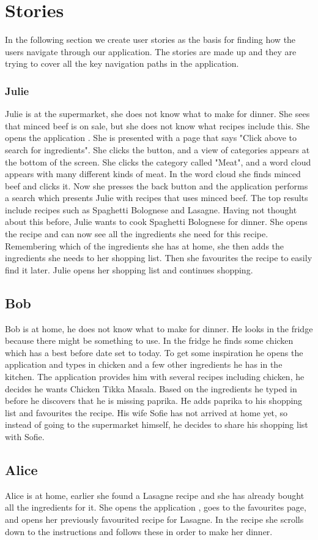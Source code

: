 \section{Stories}
In the following section we create user stories as the basis for finding how the users navigate through our application. The stories are made up and they are trying to cover all the key navigation paths in the application.

\subsubsection*{Julie}

Julie is at the supermarket, she does not know what to make for dinner. She sees that minced beef is on sale, but she does not know what recipes include this. She opens the application \appname. She is presented with a page that says "Click above to search for ingredients". She clicks the button, and a view of categories appears at the bottom of the screen. She clicks the category called "Meat", and a word cloud appears with many different kinds of meat. In the word cloud she finds minced beef and clicks it. Now she presses the back button and the application performs a search which presents Julie with recipes that uses minced beef. The top results include recipes such as Spaghetti Bolognese and Lasagne. Having not thought about this before, Julie wants to cook Spaghetti Bolognese for dinner. She opens the recipe and can now see all the ingredients she need for this recipe. Remembering which of the ingredients she has at home, she then adds the ingredients she needs to her shopping list. Then she favourites the recipe to easily find it later. Julie opens her shopping list and continues shopping.

\subsection*{Bob}
Bob is at home, he does not know what to make for dinner. He looks in the fridge because there might be something to use. In the fridge he finds some chicken which has a best before date set to today. To get some inspiration he opens the application and types in chicken and a few other ingredients he has in the kitchen. The application provides him with several recipes including chicken, he decides he wants Chicken Tikka Masala. Based on the ingredients he typed in before he discovers that he is missing paprika. He adds paprika to his shopping list and favourites the recipe. His wife Sofie has not arrived at home yet, so instead of going to the supermarket himself, he decides to share his shopping list with Sofie.

\subsection*{Alice}
Alice is at home, earlier she found a Lasagne recipe and she has already bought all the ingredients for it. She opens the application \appname, goes to the favourites page, and opens her previously favourited recipe for Lasagne. In the recipe she scrolls down to the instructions and follows these in order to make her dinner.
